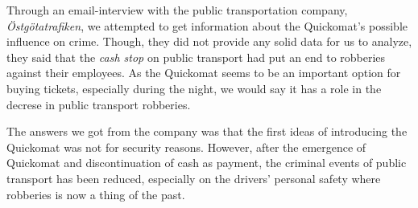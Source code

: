 \documentclass[twocolumn]{article}
\begin{document}
Through an email-interview with the public transportation company, \emph{Östgötatrafiken}, we attempted to get information about the Quickomat's possible influence on crime. Though, they did not provide any solid data for us to analyze, they said that the \emph{cash stop} on public transport had put an end to robberies against their employees. As the Quickomat seems to be an important option for buying tickets, especially during the night, we would say it has a role in the decrese in public transport robberies.

The answers we got from the company was that the first ideas of introducing the Quickomat was not for security reasons. However, after the emergence of Quickomat and discontinuation of cash as payment, the criminal events of public transport has been reduced, especially on the drivers' personal safety where robberies is now a thing of the past.
\end{document}
